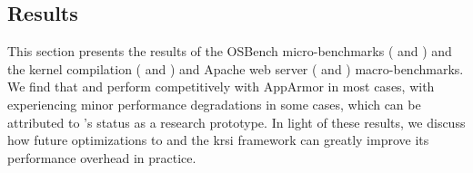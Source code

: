 


\subsection{Results}%
\label{ss:eval-results}

This section presents the results of the OSBench micro-benchmarks
( and ) and
the kernel compilation ( and ) and
Apache web server ( and )
macro-benchmarks. We find that \bpfbox{} and \bpfcontain{} perform competitively with
AppArmor in most cases, with \bpfcontain{} experiencing minor performance degradations in
some cases, which can be attributed to \bpfcontain{}'s status as a research prototype.  In
light of these results, we discuss how future optimizations to \bpfcontain{} and the
\gls{krsi} framework can greatly improve its performance overhead in practice.

